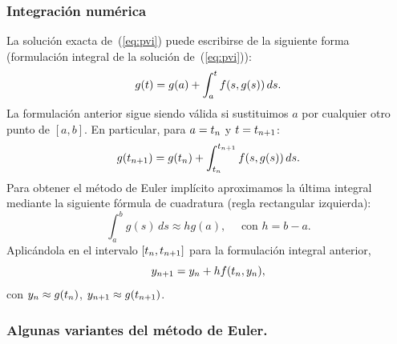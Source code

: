 \subsubsection*{Integración numérica}
La solución exacta de~(\ref{eq:pvi}) puede escribirse de la siguiente
forma (formulación integral de la solución de~(\ref{eq:pvi})):
\begin{equation*}
  g(t) = g(a) + \int_a^t f(s,g(s))\, ds.
\end{equation*}
La formulación anterior sigue siendo válida si sustituimos $a$ por cualquier otro punto de $[a,b]$. En particular, para
$a={t_n}$ y $t={t_{n+1}}$:
\begin{equation}
  \label{eq:tema4.5}
  g({t_{n+1}}) = g({t_n}) + \int_{t_n}^{t_{n+1}} f(s,g(s))\, ds.
\end{equation}
Para obtener el método de Euler implícito aproximamos la última
integral mediante la siguiente fórmula de cuadratura (regla
rectangular izquierda):
\begin{equation*}
  \int_a^b g(s)\,ds \approx hg(a), \quad \text{ con $h=b-a$}.
\end{equation*}
Aplicándola en el intervalo $[{t_n},{t_{n+1}}]$ para la formulación integral
anterior,
\begin{equation*}
  {y_{n+1}} =  {y_n} + h f({t_n},{y_n}),
\end{equation*}
con ${y_n}\approx g({t_n})$, ${y_{n+1}}\approx g({t_{n+1}})$.

%

\subsubsection*{Algunas variantes del método de Euler.}

